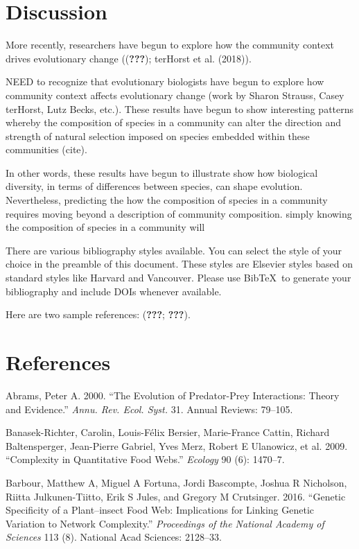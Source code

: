 \documentclass[]{elsarticle} %
\begin{document}
\section{Discussion}\label{discussion}

More recently, researchers have begun to explore how the community
context drives evolutionary change (({\textbf{???}}); terHorst et al.
(2018)).

NEED to recognize that evolutionary biologists have begun to explore how
community context affects evolutionary change (work by Sharon Strauss,
Casey terHorst, Lutz Becks, etc.). These results have begun to show
interesting patterns whereby the composition of species in a community
can alter the direction and strength of natural selection imposed on
species embedded within these communities (cite).

In other words, these results have begun to illustrate show how
biological diversity, in terms of differences between species, can shape
evolution. Nevertheless, predicting the how the composition of species
in a community requires moving beyond a description of community
composition. simply knowing the composition of species in a community
will

There are various bibliography styles available. You can select the
style of your choice in the preamble of this document. These styles are
Elsevier styles based on standard styles like Harvard and Vancouver.
Please use BibTeX~to generate your bibliography and include DOIs
whenever available.

Here are two sample references: ({\textbf{???}}; {\textbf{???}}).

\section*{References}\label{references}

\hypertarget{refs}{}
\hypertarget{ref-Abrams2000}{}
Abrams, Peter A. 2000. ``The Evolution of Predator-Prey Interactions:
Theory and Evidence.'' \emph{Annu. Rev. Ecol. Syst.} 31. Annual Reviews:
79--105.

\hypertarget{ref-Banasek-Richter2009}{}
Banasek-Richter, Carolin, Louis-Félix Bersier, Marie-France Cattin,
Richard Baltensperger, Jean-Pierre Gabriel, Yves Merz, Robert E
Ulanowicz, et al. 2009. ``Complexity in Quantitative Food Webs.''
\emph{Ecology} 90 (6): 1470--7.

\hypertarget{ref-Barbour2016}{}
Barbour, Matthew A, Miguel A Fortuna, Jordi Bascompte, Joshua R
Nicholson, Riitta Julkunen-Tiitto, Erik S Jules, and Gregory M
Crutsinger. 2016. ``Genetic Specificity of a Plant--insect Food Web:
Implications for Linking Genetic Variation to Network Complexity.''
\emph{Proceedings of the National Academy of Sciences} 113 (8). National
Acad Sciences: 2128--33.
\end{document}

